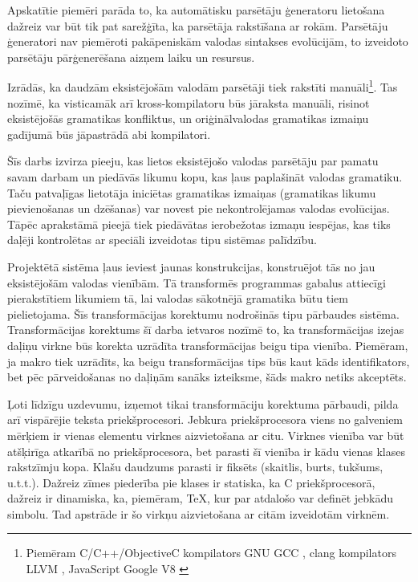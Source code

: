Apskatītie piemēri parāda to, ka automātisku parsētāju ģeneratoru lietošana dažreiz var būt tik pat sarežģīta, ka parsētāja rakstīšana ar rokām. Parsētāju ģeneratori nav piemēroti pakāpeniskām valodas sintakses evolūcijām, to izveidoto parsētāju pārģenerēšana aizņem laiku un resursus.

Izrādās, ka daudzām eksistējošām valodām parsētāji tiek rakstīti manuāli\footnote{Piemēram C/C++/ObjectiveC kompilators GNU GCC \cite{GCC}, clang kompilators LLVM \cite{clangLLVM}, JavaScript Google V8 \cite{JavascriptGoogle}}. Tas nozīmē, ka visticamāk arī kross-kompilatoru būs jāraksta manuāli, risinot eksistējošās gramatikas konfliktus, un oriģinālvalodas gramatikas izmaiņu gadījumā būs jāpastrādā abi kompilatori.

Šīs darbs izvirza pieeju, kas lietos eksistējošo valodas parsētāju par pamatu savam darbam un piedāvās likumu kopu, kas ļaus paplašināt valodas gramatiku. Taču patvaļīgas lietotāja iniciētas gramatikas izmaiņas (gramatikas likumu pievienošanas un dzēšanas) var novest pie nekontrolējamas valodas evolūcijas. Tāpēc aprakstāmā pieejā tiek piedāvātas ierobežotas izmaņu iespējas, kas tiks daļēji kontrolētas ar speciāli izveidotas tipu sistēmas palīdzību.

Projektētā sistēma ļaus ieviest jaunas konstrukcijas, konstruējot tās no jau eksistējošām valodas vienībām. Tā transformēs programmas gabalus attiecīgi pierakstītiem likumiem tā, lai valodas sākotnējā gramatika būtu tiem pielietojama. Šīs transformācijas korektumu nodrošinās tipu pārbaudes sistēma. Transformācijas korektums šī darba ietvaros nozīmē to, ka transformācijas izejas daļiņu virkne būs korekta uzrādīta transformācijas beigu tipa vienība. Piemēram, ja makro tiek uzrādīts, ka beigu transformācijas tips būs kaut kāds identifikators, bet pēc pārveidošanas no daļiņām sanāks izteiksme, šāds makro netiks akceptēts.

Ļoti līdzīgu uzdevumu, izņemot tikai transformāciju korektuma pārbaudi, pilda arī vispārējie teksta priekšprocesori. Jebkura priekšprocesora viens no galveniem mērķiem ir vienas elementu virknes aizvietošana ar citu. Virknes vienība var būt atšķirīga atkarībā no priekšprocesora, bet parasti šī vienība ir kādu vienas klases rakstzīmju kopa. Klašu daudzums parasti ir fiksēts (skaitlis, burts, tukšums, u.t.t.). Dažreiz zīmes piederība pie klases ir statiska, ka C priekšprocesorā, dažreiz ir dinamiska, ka, piemēram, \TeX{}, kur par atdalošo var definēt jebkādu simbolu. Tad apstrāde ir šo virkņu aizvietošana ar citām izveidotām virknēm.

